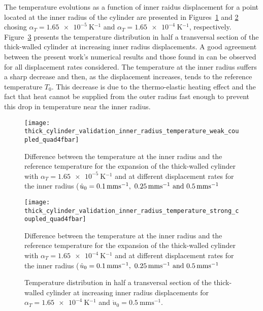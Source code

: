 The temperature evolutions as a function of inner raidus displacement for a point located at the inner radius of the cylinder are presented in Figures~\ref{fig:thick_cylinder_validation_inner_radius_temperature_weak_coupled_quad4fbar} and \ref{fig:thick_cylinder_validation_inner_radius_temperature_strong_coupled_quad4fbar} chosing \(\alpha_T = \SI{1.65e-5}{\kelvin^{-1}}\) and \(\alpha_T =\SI{1.65e-4}{\kelvin^{-1}}\), respectively.
Figure~\ref{fig:thick_cylinder_temp_dist} presents the temperature distribution in half a transversal section of the thick-walled cylinder at increasing inner radius displacements.
A good agreement between the present work's numerical results and those found in \cite{ibrahimbegovic_thermodynamics_2009} can be observed for all displacement rates considered.
The temperature at the inner radius suffers a sharp decrease and then, as the displacement increases, tends to the reference temperature \(T_0\).
This decrease is due to the thermo-elastic heating effect and the fact that heat cannot be supplied from the outer radius fast enough to prevent this drop in temperature near the inner radius.

\begin{figure}[htbp]
 \centering
 \texttt{[image: thick\_cylinder\_validation\_inner\_radius\_temperature\_weak\_coupled\_quad4fbar]}
 \caption{Difference between the temperature at the inner radius and the reference temperature for the expansion of the thick-walled cylinder with \(\alpha_T=\SI{1.65e-5}{\kelvin^{-1}}\) and at different displacement rates for the inner radius (\(\dot u_0 = \SIlist{0.1; 0.25; 0.5}{\milli\meter\second^{-1}}\)}
\label{fig:thick_cylinder_validation_inner_radius_temperature_weak_coupled_quad4fbar}

\end{figure}
\begin{figure}[htbp]
 \centering
 \texttt{[image: thick\_cylinder\_validation\_inner\_radius\_temperature\_strong\_coupled\_quad4fbar]}
 \caption{Difference between the temperature at the inner radius and the reference temperature for the expansion of the thick-walled cylinder with \(\alpha_T=\SI{1.65e-4}{\kelvin^{-1}}\) and at different displacement rates for the inner radius (\(\dot u_0 = \SIlist{0.1; 0.25; 0.5}{\milli\meter\second^{-1}}\)}
\label{fig:thick_cylinder_validation_inner_radius_temperature_strong_coupled_quad4fbar}
\end{figure}

\begin{figure}[htbp]
 \centering
 \def\svgwidth{1.0\linewidth}
 \footnotesize
 
 \caption{Temperature distribution in half a transversal section of the thick-walled cylinder at increasing inner radius displacements for \(\alpha_T=\SI{1.65e-4}{\kelvin^{-1}}\) and \(\dot u_0 = \SI{0.5}{\milli\meter\second^{-1}}\).}
\label{fig:thick_cylinder_temp_dist}
\end{figure}

